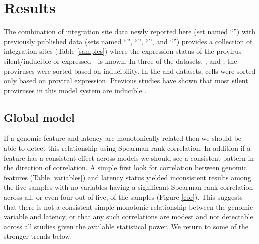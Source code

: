 \documentclass[../sherrill-Mix_thesis.tex]{subfiles}
\begin{document}
\section{Results}
	The combination of integration site data newly reported here (set named ``\Memory{}'') with previously published data (sets named ``\Jurkat{}'', ``\Bcl{}'', ``\Active{}'', and ``\Resting{}'') provides a collection of \nSites{} integration sites (Table \ref{samples}) where the expression status of the provirus---silent/inducible or expressed---is known. In three of the datasets, \Jurkat{}, \Memory{} and \Bcl{}, the proviruses were sorted based on inducibility. In the \Resting{} and \Active{} datasets, cells were sorted only based on proviral expression. Previous studies have shown that most silent proviruses in this model system are inducible \citep{Plesa2007}.

	\subsection{Global model}
		If a genomic feature and latency are monotonically related then we should be able to detect this relationship using Spearman rank correlation. In addition if a feature has a consistent effect across models we should see a consistent pattern in the direction of correlation. A simple first look for correlation between genomic features (Table \ref{variables}) and latency status yielded inconsistent results among the five samples with no variables having a significant Spearman rank correlation across all, or even four out of five, of the samples (Figure \ref{cor}). This suggests that there is not a consistent simple monotonic relationship between the genomic variable and latency, or that any such correlations are modest and not detectable across all studies given the available statistical power. We return to some of the stronger trends below.
\end{document}
